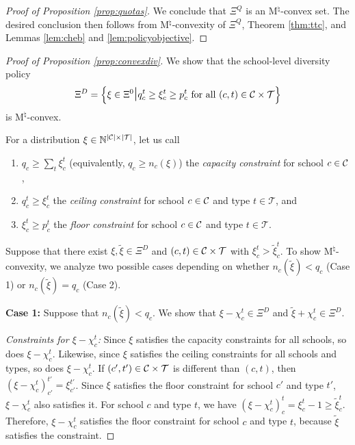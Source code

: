 \documentclass[12pt]{amsart}
\theoremstyle{remark}
\def\T{\mathcal{T}} \def\calt{\mathcal{T}}
\begin{document}
\begin{proof}[Proof of Proposition \ref{prop:quotas}]
We conclude that $\Xi^Q$ is an M$^{\natural}$-convex set. The desired conclusion then follows from M$^{\natural}$-convexity of $\Xi^Q$,
Theorem \ref{thm:ttc}, and Lemmas \ref{lem:cheb} and \ref{lem:policyobjective}.
\end{proof}
\medskip


\begin{proof}[Proof of Proposition \ref{prop:convexdiv}]
We show that the school-level diversity policy
\[\Xi^D = \left \{\xi \in \Xi^0 \mathlarger{\mathlarger{\mid}} q_c^t \geq \xi_c^t \geq p_c^t \text{ for all } (c,t)\in \calc \times \calt\right \}\]
is M$^{\natural}$-convex.

For a distribution $\xi \in \mathbb N^{|\C|\times |\T|}$, let us call
\begin{enumerate}
\item $q_c \geq \sum_t \xi_c^t$ (equivalently, $q_c \geq n_c(\xi)$) the \emph{capacity constraint} for school $c\in \mathcal{C}$,
\item $q_c^t \geq \xi_c^t$ the \emph{ceiling constraint} for school $c\in \mathcal{C}$ and type $t\in \calt$, and
\item $\xi_c^t \geq p_c^t$ the \emph{floor constraint} for school $c\in \mathcal{C}$ and type $t\in \calt$.
\end{enumerate}

Suppose that there exist $\xi,\tilde{\xi}\in \Xi^D$ and $(c,t) \in \calc \times \calt$ with $\xi_c^t>\tilde{\xi}_{c}^{t}$.
To show M$^{\natural}$-convexity, we analyze two possible cases depending on whether $n_c(\tilde \xi) < q_c$ (Case 1)
or $n_c(\tilde \xi) = q_c$ (Case 2).

\medskip
\textbf{Case 1:} Suppose that $n_c(\tilde \xi) < q_c$. We show that $\xi-\chi_c^t \in \Xi^D$ and $\tilde{\xi}+\chi_c^t \in \Xi^D$.

\smallskip
\noindent \emph{Constraints for $\xi-\chi_c^t$:} Since $\xi$ satisfies the capacity constraints for all schools, so does $\xi-\chi_c^t$.
Likewise, since $\xi$ satisfies the ceiling constraints for all schools and types, so does $\xi-\chi_c^t$. If $(c',t')\in \calc \times \calt$ is
different than $(c,t)$, then $(\xi-\chi_c^t)_{c'}^{t'}=\xi_{c'}^{t'}$. Since $\xi$ satisfies the floor constraint for school $c'$ and
type $t'$, $\xi-\chi_c^t$ also satisfies it. For school $c$ and  type $t$, we have $(\xi-\chi_c^t)_{c}^{t}=\xi_c^t-1 \geq \tilde{\xi}_c^t$.
Therefore, $\xi-\chi_c^t$ satisfies the floor constraint for school $c$ and type $t$, because $\tilde \xi$ satisfies the constraint.


\end{proof}
\end{document}
